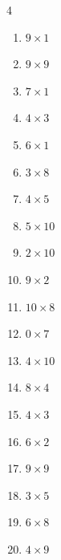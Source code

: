 \begin{multicols}{4}
\begin{enumerate}
  \item $9\times 1$
        \phantom{$=9$}

  \item $9\times 9$
        \phantom{$=81$}

  \item $7\times 1$
        \phantom{$=7$}

  \item $4\times 3$
        \phantom{$=12$}

  \item $6\times 1$
        \phantom{$=6$}

  \item $3\times 8$
        \phantom{$=24$}

  \item $4\times 5$
        \phantom{$=20$}

  \item $5\times 10$
        \phantom{$=50$}

  \item $2\times 10$
        \phantom{$=20$}

  \item $9\times 2$
        \phantom{$=18$}

  \item $10\times 8$
        \phantom{$=80$}

  \item $0\times 7$
        \phantom{$=0$}

  \item $4\times 10$
        \phantom{$=40$}

  \item $8\times 4$
        \phantom{$=32$}

  \item $4\times 3$
        \phantom{$=12$}

\columnbreak %

\resetques

  \item $6\times 2$
        \phantom{$=12$}

  \item $9\times 9$
        \phantom{$=81$}

  \item $3\times 5$
        \phantom{$=15$}

  \item $6\times 8$
        \phantom{$=48$}

  \item $4\times 9$
        \phantom{$=36$}


\end{enumerate}
\end{multicols}
